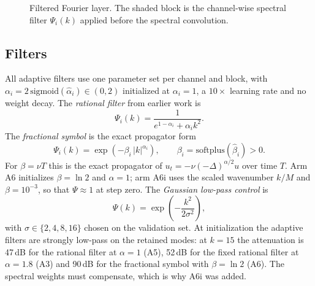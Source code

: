 \documentclass[conference]{IEEEtran}
\newcommand{\Fcal}{\mathcal{F}}
\begin{document}
\begin{figure}[t]
\centering
{}
\caption{Filtered Fourier layer. The shaded block is the channel-wise spectral filter $\Psi_i(k)$ applied before the spectral convolution.}
\label{fig:arch}
\end{figure}

\subsection{Filters}\label{sec:filters}
All adaptive filters use one parameter set per channel and block, with $\alpha_i=2\,\mathrm{sigmoid}(\hat\alpha_i)\in(0,2)$ initialized at $\alpha_i=1$, a $10\times$ learning rate and no weight decay. The \emph{rational filter} from earlier work is
\begin{equation}
\Psi_i(k)=\frac{1}{e^{1-\alpha_i}+\alpha_i k^{2}}.
\label{eq:rational}
\end{equation}
The \emph{fractional symbol} is the exact propagator form
\begin{equation}
\Psi_i(k)=\exp\!\left(-\beta_i\,|k|^{\alpha_i}\right),\qquad \beta_i=\mathrm{softplus}(\hat\beta_i)>0 .
\label{eq:power}
\end{equation}
For $\beta=\nu T$ this is the exact propagator of $u_t=-\nu(-\Delta)^{\alpha/2}u$ over time $T$. Arm A6 initializes $\beta=\ln 2$ and $\alpha=1$; arm A6i uses the scaled wavenumber $k/M$ and $\beta=10^{-3}$, so that $\Psi\approx 1$ at step zero. The \emph{Gaussian low-pass control} is
\begin{equation}
\Psi(k)=\exp\!\left(-\frac{k^2}{2\sigma^2}\right),
\label{eq:gauss}
\end{equation}
with $\sigma\in\{2,4,8,16\}$ chosen on the validation set. At initialization the adaptive filters are strongly low-pass on the retained modes: at $k=15$ the attenuation is 47\,dB for the rational filter at $\alpha=1$ (A5), 52\,dB for the fixed rational filter at $\alpha=1.8$ (A3) and 90\,dB for the fractional symbol with $\beta=\ln 2$ (A6). The spectral weights must compensate, which is why A6i was added.
\end{document}
